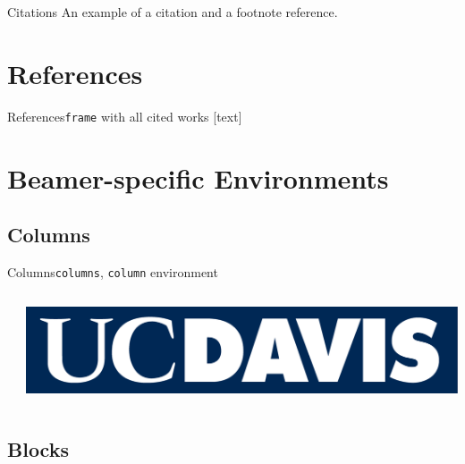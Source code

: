 \documentclass{beamer}
\begin{document}
    \begin{frame}{Citations}
      An example of a citation \cite{ref:oetiker1995not} and a footnote reference.
    \end{frame}

    \section*{References}

    \begin{frame}{References}{\texttt{frame} with all cited works}
      [text]
      
      
    \end{frame}

    \section{Beamer-specific Environments}

    \subsection{Columns}

    \begin{frame}{Columns}{\texttt{columns}, \texttt{column} environment}
    \begin{columns}
        \begin{column}{0.5\textwidth} %
            \tiny{\lipsum[1-1]}
        \end{column}

        \begin{column}{0.5\textwidth} %
            \includegraphics[width=0.9\columnwidth]{DavisLogoV3.png}
        \end{column}
    \end{columns}
    \end{frame}

    \subsection{Blocks}
\end{document}
